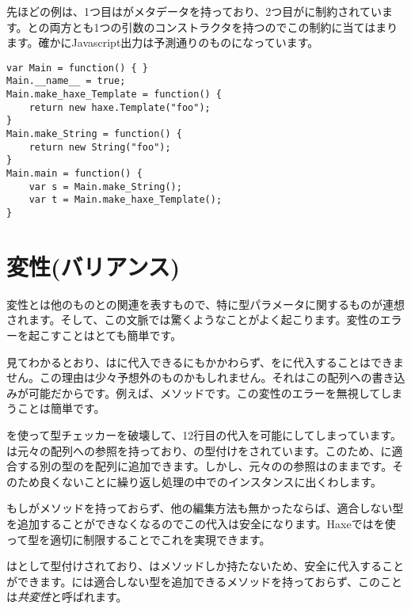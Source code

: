 先ほどの例は、1つ目はがメタデータを持っており、2つ目がに制約されています。との両方とも1つの引数のコンストラクタを持つのでこの制約に当てはまります。確かにJavascript出力は予測通りのものになっています。

\begin{lstlisting}
var Main = function() { }
Main.__name__ = true;
Main.make_haxe_Template = function() {
	return new haxe.Template("foo");
}
Main.make_String = function() {
	return new String("foo");
}
Main.main = function() {
	var s = Main.make_String();
	var t = Main.make_haxe_Template();
}
\end{lstlisting}

\section{変性(バリアンス)}
\label{type-system-variance}

変性とは他のものとの関連を表すもので、特に型パラメータに関するものが連想されます。そして、この文脈では驚くようなことがよく起こります。変性のエラーを起こすことはとても簡単です。


見てわかるとおり、はに代入できるにもかかわらず、をに代入することはできません。この理由は少々予想外のものかもしれません。それはこの配列への書き込みが可能だからです。例えば、メソッドです。この変性のエラーを無視してしまうことは簡単です。


を使って型チェッカーを破壊して、12行目の代入を可能にしてしまっています。は元々の配列への参照を持っており、の型付けをされています。このため、に適合する別の型のを配列に追加できます。しかし、元々のの参照はのままです。そのため良くないことに繰り返し処理の中でのインスタンスに出くわします。

もしがメソッドを持っておらず、他の編集方法も無かったならば、適合しない型を追加することができなくなるのでこの代入は安全になります。Haxeではを使って型を適切に制限することでこれを実現できます。


はとして型付けされており、はメソッドしか持たないため、安全に代入することができます。には適合しない型を追加できるメソッドを持っておらず、このことは\emph{共変性}と呼ばれます。

